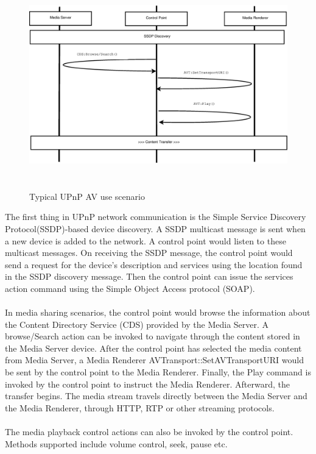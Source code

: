 \begin{figure}[htb] 
\centering \includegraphics[height=9cm]{charts/chart1} 
\caption{Typical UPnP AV use scenario \label{chart1}} 
\end{figure} 

The first thing in UPnP network communication is the Simple Service Discovery 
Protocol(SSDP)-based device discovery. A SSDP multicast message is sent when a 
new device is added to the network. A control point would listen to these 
multicast messages. On receiving the SSDP message, the control point would send a request for the device's description and services using the location found in the SSDP discovery message. Then the control point can issue the services action command using the Simple Object Access protocol (SOAP).\\
\\ 
In media sharing scenarios, the control point would browse the information about 
the Content Directory Service (CDS) provided by the Media Server. A 
browse/Search action can be invoked to navigate through the content stored in 
the Media Server device. After the control point has selected the media content from 
Media Server, a Media Renderer AVTransport::SetAVTransportURI would be sent by 
the control point to the Media Renderer. Finally, the Play command is invoked by 
the control point to instruct the Media Renderer. Afterward, the transfer begins. The media 
stream travels directly between the Media Server and the Media Renderer, through HTTP, 
RTP or other streaming protocols. \\
\\
The media playback control actions can also be invoked by the control point. Methods 
supported include volume control, seek, pause etc. 

